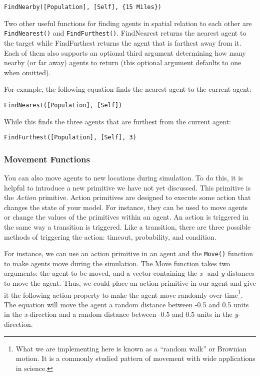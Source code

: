 \documentclass[]{memoir}
\begin{document}
\lstinline!FindNearby([Population], [Self], {15 Miles})!

Two other useful functions for finding agents in spatial relation to
each other are \lstinline!FindNearest()! and \lstinline!FindFurthest()!.
FindNearest returns the nearest agent to the target while FindFurthest
returns the agent that is farthest away from it. Each of them also
supports an optional third argument determining how many nearby (or far
away) agents to return (this optional argument defaults to one when
omitted).

For example, the following equation finds the nearest agent to the
current agent:

\lstinline!FindNearest([Population], [Self])!

While this finds the three agents that are furthest from the current
agent:

\lstinline!FindFurthest([Population], [Self], 3)!

\subsubsection{Movement Functions}

You can also move agents to new locations during simulation. To do this,
it is helpful to introduce a new primitive we have not yet discussed.
This primitive is the \emph{Action} primitive. Action primitives are
designed to execute some action that changes the state of your model.
For instance, they can be used to move agents or change the values of
the primitives within an agent. An action is triggered in the same way a
transition is triggered. Like a transition, there are three possible
methods of triggering the action: timeout, probability, and condition.

For instance, we can use an action primitive in an agent and the
\lstinline!Move()! function to make agents move during the simulation.
The Move function takes two arguments: the agent to be moved, and a
vector containing the \emph{x}- and \emph{y}-distances to move the
agent. Thus, we could place an action primitive in our agent and give it
the following action property to make the agent move randomly over
time\footnote{What we are implementing here is known as a ``random
  walk'' or Brownian motion. It is a commonly studied pattern of
  movement with wide applications in science.}. The equation will move
the agent a random distance between -0.5 and 0.5 units in the
\emph{x}-direction and a random distance between -0.5 and 0.5 units in
the \emph{y}-direction.
\end{document}
